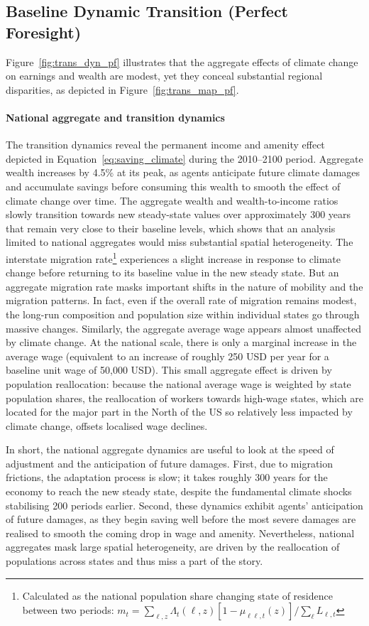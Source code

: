 \documentclass[12pt, a4paper]{article}
\begin{document}
\subsection{Baseline Dynamic Transition (Perfect Foresight)}
Figure~\ref{fig:trans_dyn_pf} illustrates that the aggregate effects of climate change on earnings and wealth are modest, yet they conceal substantial regional disparities, as depicted in Figure~\ref{fig:trans_map_pf}.
\paragraph{National aggregate and transition dynamics}
The transition dynamics reveal the permanent income and amenity effect depicted in Equation~\ref{eq:saving_climate} during the 2010--2100 period. Aggregate wealth increases by 4.5\% at its peak, as agents anticipate future climate damages and accumulate savings before consuming this wealth to smooth the effect of climate change over time. The aggregate wealth and wealth-to-income ratios slowly transition towards new steady-state values over approximately 300 years that remain very close to their baseline levels, which shows that an analysis limited to national aggregates would miss substantial spatial heterogeneity. The interstate migration rate\footnote{Calculated as the national population share changing state of residence between two periods: $m_t = \sum_{\ell,z} \Lambda_t(\ell,z) [1 - \mu_{\ell \ell,t}(z)] / \sum_\ell L_{\ell,t}$} experiences a slight increase in response to climate change before returning to its baseline value in the new steady state. But an aggregate migration rate masks important shifts in the nature of mobility and the migration patterns. In fact, even if the overall rate of migration remains modest, the long-run composition and population size within individual states go through massive changes. Similarly, the aggregate average wage appears almost unaffected by climate change. At the national scale, there is only a marginal increase in the average wage (equivalent to an increase of roughly 250 USD per year for a baseline unit wage of 50,000 USD). This small aggregate effect is driven by population reallocation: because the national average wage is weighted by state population shares, the reallocation of workers towards high-wage states, which are located for the major part in the North of the US so relatively less impacted by climate change, offsets localised wage declines.

In short, the national aggregate dynamics are useful to look at the speed of adjustment and the anticipation of future damages. First, due to migration frictions, the adaptation process is slow; it takes roughly 300 years for the economy to reach the new steady state, despite the fundamental climate shocks stabilising 200 periods earlier. Second, these dynamics exhibit agents' anticipation of future damages, as they begin saving well before the most severe damages are realised to smooth the coming drop in wage and amenity. Nevertheless, national aggregates mask large spatial heterogeneity, are driven by the reallocation of populations across states and thus miss a part of the story.

\end{document}
